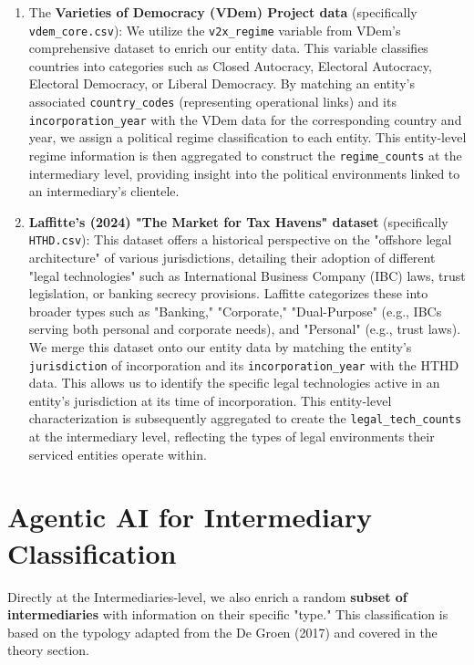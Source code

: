 \begin{enumerate}
  \item The \textbf{Varieties of Democracy (VDem) Project data} (specifically \texttt{vdem\_core.csv}): We utilize the \texttt{v2x\_regime} variable from VDem's comprehensive dataset to enrich our entity data. This variable classifies countries into categories such as Closed Autocracy, Electoral Autocracy, Electoral Democracy, or Liberal Democracy. By matching an entity's associated \texttt{country\_codes} (representing operational links) and its \texttt{incorporation\_year} with the VDem data for the corresponding country and year, we assign a political regime classification to each entity. This entity-level regime information is then aggregated to construct the \texttt{regime\_counts} at the intermediary level, providing insight into the political environments linked to an intermediary's clientele.
  
  \item \textbf{Laffitte's (2024) "The Market for Tax Havens" dataset} (specifically \texttt{HTHD.csv}): This dataset offers a historical perspective on the "offshore legal architecture" of various jurisdictions, detailing their adoption of different "legal technologies" such as International Business Company (IBC) laws, trust legislation, or banking secrecy provisions. Laffitte categorizes these into broader types such as "Banking," "Corporate," "Dual-Purpose" (e.g., IBCs serving both personal and corporate needs), and "Personal" (e.g., trust laws). We merge this dataset onto our entity data by matching the entity's \texttt{jurisdiction} of incorporation and its \texttt{incorporation\_year} with the HTHD data. This allows us to identify the specific legal technologies active in an entity's jurisdiction at its time of incorporation. This entity-level characterization is subsequently aggregated to create the \texttt{legal\_tech\_counts} at the intermediary level, reflecting the types of legal environments their serviced entities operate within.
\end{enumerate}

\section{Agentic AI for Intermediary Classification}
\label{sec:3_3}

Directly at the Intermediaries-level, we also enrich a random \textbf{subset of intermediaries} with information on their specific "type." This classification is based on the typology adapted from the De Groen (2017) and covered in the theory section. 

